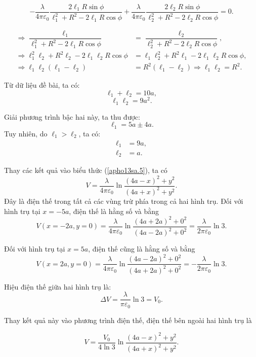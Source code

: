 \begin{loigiai}
\begin{enumerate}[1)]
  \[-\dfrac{\lambda}{4\pi\varepsilon_0}\dfrac{2\ell_1 R\sin{\phi}}{\ell_1^2+R^2-2\ell_1R\cos{\phi}}+\dfrac{\lambda}{4\pi\varepsilon_0}\dfrac{2\ell_2R\sin{\phi}}{\ell_2^2+R^2-2\ell_2R\cos{\phi}}=0. \tag{8} \label{apho13sa.8}\]
  
  \begin{align*}
      \Rightarrow\dfrac{\ell_1}{\ell_1^2+R^2-2\ell_1R\cos{\phi}}  &=\dfrac{\ell_2}{\ell_2^2+R^2-2\ell_2R\cos{\phi}},\\
      \Rightarrow \ell_1^2\ell_2+R^2\ell_2-2\ell_1\ell_2R\cos{\phi} &=\ell_1\ell_2^2+R^2\ell_1-2\ell_1\ell_2R\cos{\phi},\\
      \Rightarrow \ell_1\ell_2(\ell_1-\ell_2) &=R^2(\ell_1-\ell_2) \Rightarrow \ell_1\ell_2=R^2. \tag{9} \label{apho13sa.9}
  \end{align*}
  
  Từ dữ liệu đề bài, ta có:
  \[\ell_1+\ell_2=10a \tag{10}, \label{apho13sa.10}\]
  \[\ell_1\ell_2=9a^2 \tag{11}. \label{apho13sa.11}\]
  
  Giải phương trình bậc hai này, ta thu được:
  \[\ell_1=5a\pm 4a. \tag{12} \label{aphp13sa.12}\]
  Tuy nhiên, do $\ell_1>\ell_2$, ta có:
  \begin{align*}
      \ell_1 &= 9a, \tag{13} \label{apho13sa.13}\\
      \ell_2&=a. \tag{14} \label{apho13sa.14}
  \end{align*}
  
  Thay các kết quả vào biểu thức (\ref{apho13sa.5}), ta có
  \[V=\dfrac{\lambda}{4\pi\varepsilon_0}\ln{\dfrac{(4a-x)^2+y^2}{(4a+x)^2+y^2}}. \tag{15} \label{apho13sa.15}\]
  Đây là điện thế trong tất cả các vùng trừ phía trong cả hai hình trụ. Đối với hình trụ tại $x=-5a$, điện thế là hằng số và bằng
  \[V(x=-2a,y=0)=\dfrac{\lambda}{4\pi\varepsilon_0}\ln{\dfrac{(4a+2a)^2+0^2}{(4a-2a)^2+0^2}}=\dfrac{\lambda}{2\pi\varepsilon_0}\ln{3}. \tag{16} \label{apho13sa.16}\]
  
  Đối với hình trụ tại $x=5a$, điện thế cũng là hằng số và bằng
  \[V(x=2a,y=0)=\dfrac{\lambda}{4\pi\varepsilon_0}\ln{\dfrac{(4a-2a)^2+0^2}{(4a+2a)^2+0^2}}=-\dfrac{\lambda}{2\pi\varepsilon_0}\ln{3}. \tag{17} \label{apho13sa.17}\]
  
  Hiệu điện thế giữa hai hình trụ là:
  \[\Delta V=\dfrac{\lambda}{\pi\varepsilon_0}\ln{3}=V_0. \tag{18} \label{apho13sa.18}\]
  
  Thay kết quả này vào phương trình điện thế, điện thế bên ngoài hai hình trụ là 
  
  \[V=\dfrac{V_0}{4\ln{3}}\ln{\dfrac{(4a-x)^2+y^2}{(4a+x)^2+y^2}}. \tag{19} \label{apho13sa.19}\]
  

\end{enumerate}
\end{loigiai}
